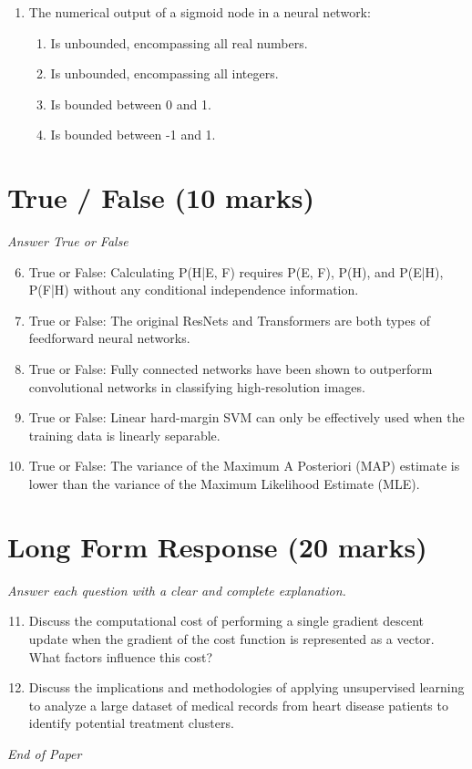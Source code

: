 \documentclass[12pt]{article}
\begin{document}
\begin{enumerate}[label=\arabic*.]
\begin{enumerate}[label=(\alph*)]
    \item False, True
\end{enumerate}
\item The numerical output of a sigmoid node in a neural network:
\begin{enumerate}[label=(\alph*)]
    \item Is unbounded, encompassing all real numbers.
    \item Is unbounded, encompassing all integers.
    \item Is bounded between 0 and 1.
    \item Is bounded between -1 and 1.
\end{enumerate}
\end{enumerate}

\section*{True / False (10 marks)}
\textit{Answer True or False}
\begin{enumerate}[label=\arabic*.]
\setcounter{enumi}{5}
\item True or False: Calculating P(H|E, F) requires P(E, F), P(H), and P(E|H), P(F|H) without any conditional independence information.
\item True or False: The original ResNets and Transformers are both types of feedforward neural networks.
\item True or False: Fully connected networks have been shown to outperform convolutional networks in classifying high-resolution images.
\item True or False: Linear hard-margin SVM can only be effectively used when the training data is linearly separable.
\item True or False: The variance of the Maximum A Posteriori (MAP) estimate is lower than the variance of the Maximum Likelihood Estimate (MLE).
\end{enumerate}

\section*{Long Form Response (20 marks)}
\textit{Answer each question with a clear and complete explanation.}
\begin{enumerate}[label=\arabic*.]
\setcounter{enumi}{10}
\item Discuss the computational cost of performing a single gradient descent update when the gradient of the cost function is represented as a vector. What factors influence this cost?
\item Discuss the implications and methodologies of applying unsupervised learning to analyze a large dataset of medical records from heart disease patients to identify potential treatment clusters.
\end{enumerate}

\vfill
\noindent\textit{End of Paper}
\end{document}
